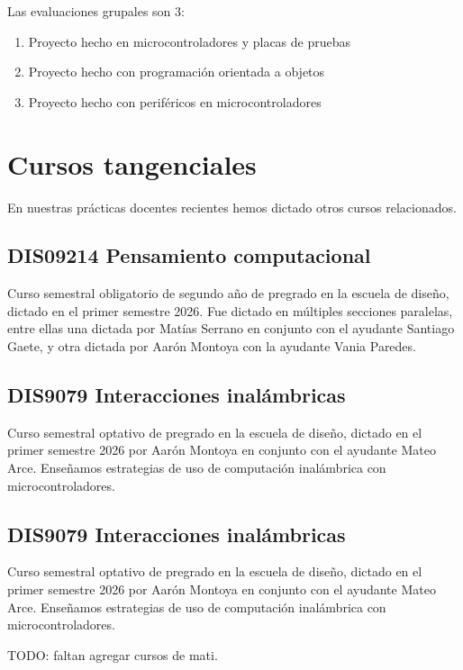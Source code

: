 \documentclass[../principal.tex]{subfiles}
\begin{document}
Las evaluaciones grupales son 3:

\begin{enumerate}
    \item Proyecto hecho en microcontroladores y placas de pruebas
    \item Proyecto hecho con programación orientada a objetos
    \item Proyecto hecho con periféricos en microcontroladores
\end{enumerate}

\section{Cursos tangenciales}

En nuestras prácticas docentes recientes hemos dictado otros cursos relacionados.

\subsection{DIS09214 Pensamiento computacional}

Curso semestral obligatorio de segundo año de pregrado en la escuela de diseño, dictado en el primer semestre 2026. Fue dictado en múltiples secciones paralelas, entre ellas una dictada por Matías Serrano en conjunto con el ayudante Santiago Gaete, y otra dictada por Aarón Montoya con la ayudante Vania Paredes.

\subsection{DIS9079 Interacciones inalámbricas}

Curso semestral optativo de pregrado en la escuela de diseño, dictado en el primer semestre 2026 por Aarón Montoya en conjunto con el ayudante Mateo Arce. Enseñamos estrategias de uso de computación inalámbrica con microcontroladores.

\subsection{DIS9079 Interacciones inalámbricas}

Curso semestral optativo de pregrado en la escuela de diseño, dictado en el primer semestre 2026 por Aarón Montoya en conjunto con el ayudante Mateo Arce. Enseñamos estrategias de uso de computación inalámbrica con microcontroladores.

TODO: faltan agregar cursos de mati.

\newpage
\end{document}
